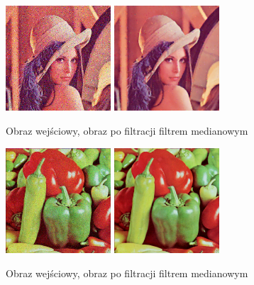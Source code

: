 \documentclass[final,a4paper,openany,12pt]{mwbk}
\begin{document}
\begin{figure}[H]
	\begin{center}
		\includegraphics[width=0.35\textwidth]{lena_color_noise}
		\includegraphics[width=0.35\textwidth]{lena_color_noise_median_result}
	\end{center}
	\caption{Obraz wejściowy, obraz po filtracji filtrem medianowym}
\end{figure}

\begin{figure}[H]
	\begin{center}
		\includegraphics[width=0.35\textwidth]{peppers_color_noise}
		\includegraphics[width=0.35\textwidth]{peppers_color_noise_median_result}
	\end{center}
	\caption{Obraz wejściowy, obraz po filtracji filtrem medianowym}
\end{figure}
\end{document}
